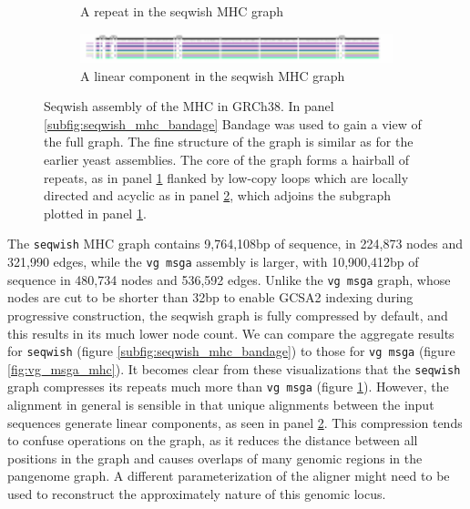 \documentclass[a4paper,12pt,numbered,oneside]{Classes/PhDThesisPSnPDF}
\begin{document}
\begin{figure}[htbp!]
\begin{subfigure}[t]{0.49\textwidth}
    \caption{A repeat in the seqwish MHC graph}
    \label{subfig:seqwish_mhc_neato}
  \end{subfigure}
  \begin{subfigure}[t]{0.9\textwidth}
    \includegraphics[width=1.0\textwidth]{Chapter3/Figs/seqwish_MHC_n492324_viz.pdf}
    \caption{A linear component in the seqwish MHC graph}
    \label{subfig:seqwish_mhc_viz}
  \end{subfigure}
  \caption[Seqwish assembly of the MHC in GRCh38.]{
    Seqwish assembly of the MHC in GRCh38.
    In panel \ref{subfig:seqwish_mhc_bandage} Bandage was used to gain a view of the full graph.
    The fine structure of the graph is similar as for the earlier yeast assemblies.
    The core of the graph forms a hairball of repeats, as in panel \ref{subfig:seqwish_mhc_neato} flanked by low-copy loops which are locally directed and acyclic as in panel \ref{subfig:seqwish_mhc_viz}, which adjoins the subgraph plotted in panel \ref{subfig:seqwish_mhc_neato}.
  }
  \label{fig:seqwish_mhc}
\end{figure}

The {\tt seqwish} MHC graph contains 9,764,108bp of sequence, in 224,873 nodes and 321,990 edges, while the {\tt vg msga} assembly is larger, with 10,900,412bp of sequence in 480,734 nodes and 536,592 edges.
Unlike the {\tt vg msga} graph, whose nodes are cut to be shorter than 32bp to enable GCSA2 indexing during progressive construction, the seqwish graph is fully compressed by default, and this results in its much lower node count.
We can compare the aggregate results for {\tt seqwish} (figure \ref{subfig:seqwish_mhc_bandage}) to those for {\tt vg msga} (figure \ref{fig:vg_msga_mhc}).
It becomes clear from these visualizations that the {\tt seqwish} graph compresses its repeats much more than {\tt vg msga} (figure \ref{subfig:seqwish_mhc_neato}).
However, the alignment in general is sensible in that unique alignments between the input sequences generate linear components, as seen in panel \ref{subfig:seqwish_mhc_viz}.
This compression tends to confuse operations on the graph, as it reduces the distance between all positions in the graph and causes overlaps of many genomic regions in the pangenome graph.
A different parameterization of the aligner might need to be used to reconstruct the approximately nature of this genomic locus.
\end{document}
